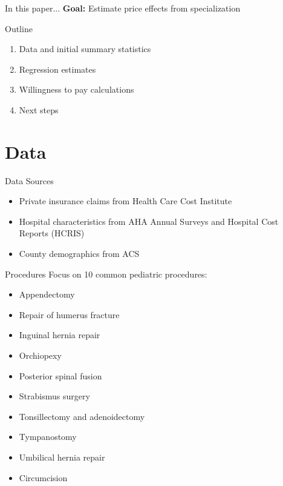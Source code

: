 \documentclass[t,aspectratio=169]{beamer}
\begin{document}
\begin{frame}{In this paper...}
    \textbf{Goal:} Estimate price effects from specialization
\end{frame}

\begin{frame}{Outline}
    \begin{enumerate}
        \item Data and initial summary statistics
        \item Regression estimates
        \item Willingness to pay calculations
        \item Next steps
    \end{enumerate}
\end{frame}

\section{Data}
\begin{frame}{Data Sources}
    \begin{itemize}
        \item Private insurance claims from Health Care Cost Institute
        \item Hospital characteristics from AHA Annual Surveys and Hospital Cost Reports (HCRIS)
        \item County demographics from ACS
    \end{itemize}
\end{frame}

\begin{frame}{Procedures}
    Focus on 10 common pediatric procedures:
    \begin{multicols}{2}
        \begin{itemize}
            \item Appendectomy
            \item Repair of humerus fracture
            \item Inguinal hernia repair
            \item Orchiopexy
            \item Posterior spinal fusion
            \item Strabismus surgery
            \item Tonsillectomy and adenoidectomy
            \item Tympanostomy
            \item Umbilical hernia repair
            \item Circumcision
        \end{itemize}
    \end{multicols}
\end{frame}
\end{document}
